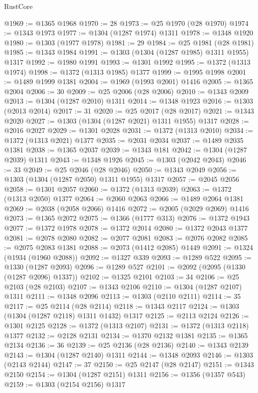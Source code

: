 \begin{lexlean}{RustCore}
\begin{coremodule}
@1969 := @1365 @1968
@1970 := 28
@1973 := @25 @1970 (@28 @1970)
@1974 := @1343 @1973
@1977 := @1304 (@1287 @1974) @1311
@1978 := @1348 @1920
@1980 := @1303 (@1977 @1978)
@1981 := 29
@1984 := @25 @1981 (@28 @1981)
@1985 := @1343 @1984
@1991 := @1303 (@1304 (@1287 @1985) @1311 @1955) @1317
@1992 := @1980 @1991
@1993 := @1301 @1992
@1995 := @1372 (@1313 @1974)
@1998 := @1372 (@1313 @1985) @1377
@1999 := @1995 @1998
@2001 := @1489 @1999 @1381
@2004 := @1969 (@1993 @2001) @1416
@2005 := @1365 @2004
@2006 := 30
@2009 := @25 @2006 (@28 @2006)
@2010 := @1343 @2009
@2013 := @1304 (@1287 @2010) @1311
@2014 := @1348 @1923
@2016 := @1303 (@2013 @2014)
@2017 := 31
@2020 := @25 @2017 (@28 @2017)
@2021 := @1343 @2020
@2027 := @1303 (@1304 (@1287 @2021) @1311 @1955) @1317
@2028 := @2016 @2027
@2029 := @1301 @2028
@2031 := @1372 (@1313 @2010)
@2034 := @1372 (@1313 @2021) @1377
@2035 := @2031 @2034
@2037 := @1489 @2035 @1381
@2038 := @1365 @2037
@2039 := @1343 @181
@2042 := @1304 (@1287 @2039) @1311
@2043 := @1348 @1926
@2045 := @1303 (@2042 @2043)
@2046 := 33
@2049 := @25 @2046 (@28 @2046)
@2050 := @1343 @2049
@2056 := @1303 (@1304 (@1287 @2050) @1311 @1955) @1317
@2057 := @2045 @2056
@2058 := @1301 @2057
@2060 := @1372 (@1313 @2039)
@2063 := @1372 (@1313 @2050) @1377
@2064 := @2060 @2063
@2066 := @1489 @2064 @1381
@2069 := @2038 (@2058 @2066) @1416
@2072 := @2005 (@2029 @2069) @1416
@2073 := @1365 @2072
@2075 := @1366 (@1777 @313)
@2076 := @1372 @1943
@2077 := @1372 @1978
@2078 := @1372 @2014
@2080 := @1372 @2043 @1377
@2081 := @2078 @2080
@2082 := @2077 @2081
@2083 := @2076 @2082
@2085 := @2075 @2083 @1381
@2088 := @2073 (@1412 @2085) @1449
@2091 := @1324 (@1934 (@1960 @2088))
@2092 := @1327 @339
@2093 := @1289 @522
@2095 := @1330 (@1287 @2093)
@2096 := @1289 @527
@2101 := @2092 (@2095 (@1330 (@1287 @2096) @1337))
@2102 := @1325 @2101
@2103 := 34
@2106 := @25 @2103 (@28 @2103)
@2107 := @1343 @2106
@2110 := @1304 (@1287 @2107) @1311
@2111 := @1348 @2096
@2113 := @1303 (@2110 @2111)
@2114 := 35
@2117 := @25 @2114 (@28 @2114)
@2118 := @1343 @2117
@2124 := @1303 (@1304 (@1287 @2118) @1311 @1432) @1317
@2125 := @2113 @2124
@2126 := @1301 @2125
@2128 := @1372 (@1313 @2107)
@2131 := @1372 (@1313 @2118) @1377
@2132 := @2128 @2131
@2134 := @1370 @2132 @1381
@2135 := @1365 @2134
@2136 := 36
@2139 := @25 @2136 (@28 @2136)
@2140 := @1343 @2139
@2143 := @1304 (@1287 @2140) @1311
@2144 := @1348 @2093
@2146 := @1303 (@2143 @2144)
@2147 := 37
@2150 := @25 @2147 (@28 @2147)
@2151 := @1343 @2150
@2154 := @1304 (@1287 @2151) @1311
@2156 := @1356 (@1357 @543)
@2159 := @1303 (@2154 @2156) @1317

\end{coremodule}
\end{lexlean}
